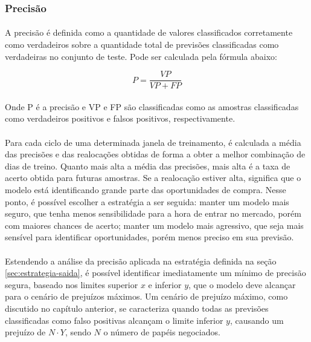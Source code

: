 \documentclass[grad,numbers]{coppe}
\begin{document}
                \subsubsection{Precisão}
                    \paragraph{}A precisão é definida como a quantidade de valores classificados corretamente como verdadeiros sobre a quantidade total de previsões classificadas como verdadeiras no conjunto de teste. Pode ser calculada pela fórmula abaixo:
                    
                    \begin{equation}
                        P = \frac{VP}{VP + FP}
                    \end{equation}
                    
                    \paragraph{}Onde P é a precisão e VP e FP são classificadas como as amostras classificadas como verdadeiros positivos e falsos positivos, respectivamente.
                    
                \paragraph{}Para cada ciclo de uma determinada janela de treinamento, é calculada a média das precisões e das realocações obtidas de forma a obter a melhor combinação de dias de treino. Quanto mais alta a média das precisões, mais alta é a taxa de acerto obtida para futuras amostras. Se a realocação estiver alta, significa que o modelo está identificando grande parte das oportunidades de compra. Nesse ponto, é possível escolher a estratégia a ser seguida: manter um modelo mais seguro, que tenha menos sensibilidade para a hora de entrar no mercado, porém com maiores chances de acerto; manter um modelo mais agressivo, que seja mais sensível para identificar oportunidades, porém menos preciso em sua previsão.
                
                \paragraph{}Estendendo a análise da precisão aplicada na estratégia definida na seção \ref{sec:estrategia-saida}, é possível identificar imediatamente um mínimo de precisão segura, baseado nos limites superior $x$ e inferior $y$, que o modelo deve alcançar para o cenário de prejuízos máximos. Um cenário de prejuízo máximo, como discutido no capítulo anterior, se caracteriza quando todas as previsões classificadas como falso positivas alcançam o limite inferior $y$, causando um prejuízo de $N \cdot Y$, sendo $N$ o número de papéis negociados. 
                
\end{document}
